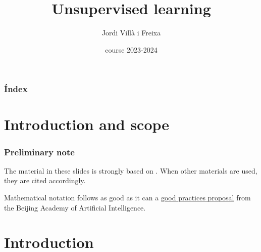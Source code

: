\documentclass{beamer}
\title[Unsupervised learning]{Unsupervised learning} %
\author{Jordi Villà i Freixa} %
\institute[FCTE] %
{
Universitat de Vic - Universitat Central de Catalunya \\
Study Abroad\\ %
\medskip
\textit{jordi.villa@uvic.cat} %
}
\date{course 2023-2024}
\begin{document}
\begin{frame}
\titlepage %
\end{frame}

\begin{frame}
\frametitle{Índex} %
\tableofcontents %
\end{frame}

\section{Introduction and scope}
\begin{frame}
  \frametitle{Preliminary note}
  The material in these slides is strongly based on \cite{kroese2020}. When other materials are used, they are cited accordingly.

  Mathematical notation follows as good as it can a \href{https://ctan.math.utah.edu/ctan/tex-archive/macros/latex/contrib/mlmath/mlmath.pdf}{good practices proposal} from the Beijing Academy of Artificial Intelligence.
  \end{frame}

\section{Introduction} %

\end{document}
